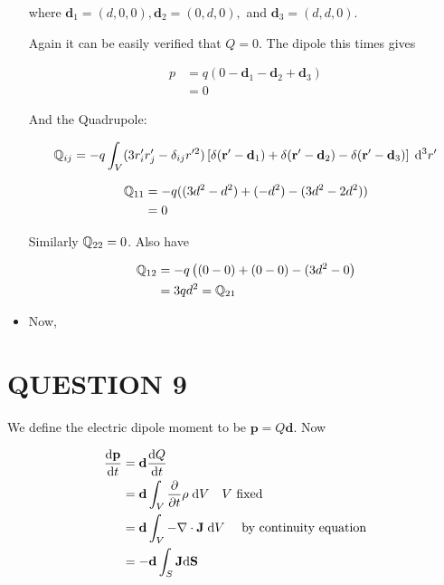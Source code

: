 \documentclass[a4paper]{article}
\begin{document}
\begin{itemize}
	where $ \mathbf{d}_{1} = (d,0,0), \mathbf{d}_{2} = (0,d,0), $ and $ \mathbf{d}_{3} = (d,d,0) $. 
	
	Again it can be easily verified that $ Q = 0 $. The dipole this times gives
	
	\begin{align*}
	p & = q(0 - \mathbf{d}_{1} - \mathbf{d}_{2} + \mathbf{d}_{3}) \\
	& = 0
	\end{align*}
	
	And the Quadrupole:
	
	\begin{align*}
	\mathbb{Q}_{ij} & = - q \int_{V} ( 3 r'_{i} r'_{j} - \delta_{ij} r'^{2} ) \left[   \delta(\mathbf{r'} - \mathbf{d}_{1}) +  \delta(\mathbf{r'} -  \mathbf{d}_{2}) -  \delta(\mathbf{r'} -  \mathbf{d}_{3}) \right]  \;  \mathrm{d}^{3} r' \\
	\end{align*}
	
	\begin{align*}
	\mathbb{Q}_{11} & = -q ( (3d^{2} - d^{2}) +  (- d^{2})-  (3d^{2} - 2d^{2}) ) \\
	& = 0
	\end{align*}
	
	Similarly $ \mathbb{Q}_{22} = 0 $. Also have
	
	\begin{align*}
	\mathbb{Q}_{12} & =   - q \left(  (0 - 0) + (0 - 0) - (3d^{2} - 0   \right)  \\
	& = 3qd^{2} = \mathbb{Q}_{21}
	\end{align*}
	
	\item Now, 	
	
	
	
	
	
	
	
	
\end{itemize}




\section{QUESTION 9}

We define the electric dipole moment to be $ \mathbf{p} = Q \mathbf{d} $. Now

\begin{align*}
\frac{\mathrm{d} \mathbf{p}}{\mathrm{d} t} & = \mathbf{d} \frac{\mathrm{d} Q}{\mathrm{d} t} \\
& = \mathbf{d} \int_{V} \frac{\partial }{\partial t} \rho \; \mathrm{d} V \quad V \text{ fixed} \\
& = \mathbf{d} \int_{V} - \nabla \cdot \mathbf{J} \; \mathrm{d} V \quad \text{ by continuity equation} \\
& = - \mathbf{d} \int_{S} \mathbf{J}  \mathrm{d} \mathbf{S}
\end{align*}
\end{document}
